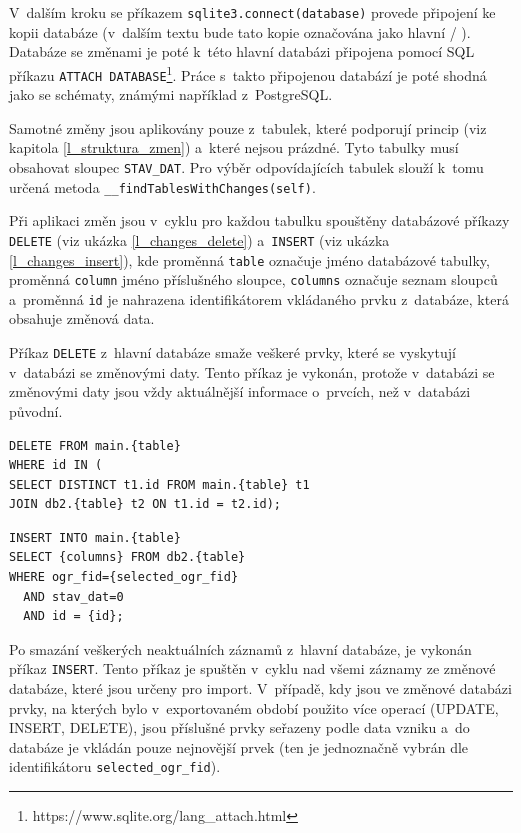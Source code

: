 \documentclass[a4paper,12pt,oneside]{book}
\begin{document}
V~dalším kroku se příkazem \texttt{sqlite3.connect(database)} provede připojení ke kopii databáze (v~dalším textu bude tato kopie označována jako hlavní / ). Databáze se změnami je poté k~této hlavní databázi připojena pomocí SQL příkazu \texttt{ATTACH DATABASE}\footnote{https://www.sqlite.org/lang\_attach.html}. Práce s~takto připojenou databází je poté shodná jako se schématy, známými například z~PostgreSQL.

Samotné změny jsou aplikovány pouze z~tabulek, které podporují princip  (viz kapitola \ref{l_struktura_zmen}) a~které nejsou prázdné. Tyto tabulky musí obsahovat sloupec \texttt{STAV\_DAT}. Pro výběr odpovídajících tabulek slouží k~tomu určená metoda \texttt{\_\_findTablesWithChanges(self)}.

Při aplikaci změn jsou v~cyklu pro každou tabulku spouštěny databázové příkazy \texttt{DELETE} (viz ukázka \ref{l_changes_delete}) a~\texttt{INSERT} (viz ukázka \ref{l_changes_insert}), kde proměnná \texttt{table} označuje jméno databázové tabulky, proměnná \texttt{column} jméno příslušného sloupce,  \texttt{columns} označuje seznam sloupců a~proměnná \texttt{id} je nahrazena identifikátorem vkládaného prvku z~databáze, která obsahuje změnová data. 

Příkaz \texttt{DELETE} z~hlavní databáze smaže veškeré prvky, které se vyskytují v~databázi se změnovými daty. Tento příkaz je vykonán, protože v~databázi se změnovými daty jsou vždy aktuálnější informace o~prvcích, než v~databázi původní. 

\begin{lstlisting}[style=sql, caption={Aplikace změn -- příkaz DELETE}, 
		    label=l_changes_delete]
DELETE FROM main.{table}
WHERE id IN (
SELECT DISTINCT t1.id FROM main.{table} t1
JOIN db2.{table} t2 ON t1.id = t2.id);
\end{lstlisting}

\begin{lstlisting}[style=sql, 
		    caption={Aplikace změn -- příkaz INSERT}, 
		    label=l_changes_insert]
INSERT INTO main.{table}
SELECT {columns} FROM db2.{table}
WHERE ogr_fid={selected_ogr_fid}
  AND stav_dat=0
  AND id = {id};
\end{lstlisting}

Po smazání veškerých neaktuálních záznamů z~hlavní databáze, je vykonán příkaz \texttt{INSERT}. Tento příkaz je spuštěn v~cyklu nad všemi záznamy ze změnové databáze, které jsou určeny pro import. V~případě, kdy jsou ve změnové databázi prvky, na kterých bylo v~exportovaném období použito více operací (UPDATE, INSERT, DELETE), jsou příslušné prvky seřazeny podle data vzniku a~do databáze je vkládán pouze nejnovější prvek (ten je jednoznačně vybrán dle identifikátoru \texttt{selected\_ogr\_fid}).
\end{document}
